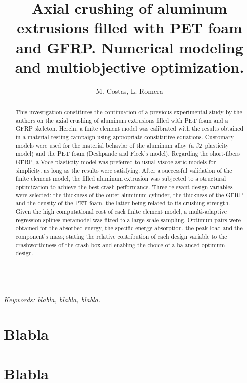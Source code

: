 \documentclass[cmfonts]{witpress}
\begin{document}
\title{Axial crushing of aluminum extrusions filled with PET foam and GFRP. Numerical modeling and multiobjective optimization.}

\author{M. Costas, L. Romera}

\address{Structural Mechanics Group, Universidade da Coru\~na, Spain}

\maketitle

\begin{abstract}
This investigation constitutes the continuation of a previous experimental study by the authors on the axial crushing of aluminum extrusions filled with PET foam and a GFRP skeleton. Herein, a finite element model was calibrated with the results obtained in a material testing campaign using appropriate constitutive equations. Customary models were used for the material behavior of the aluminum alloy (a J2--plasticity model) and the PET foam (Deshpande and Fleck's model). Regarding the short-fibers GFRP, a Voce plasticity model was preferred to usual viscoelastic models for simplicity, as long as the results were satisfying. After a successful validation of the finite element model, the filled aluminum extrusion was subjected to a structural optimization to achieve the best crash performance. Three relevant design variables were selected: the thickness of the outer aluminum cylinder, the thickness of the GFRP and the density of the PET foam, the latter being related to its crushing strength. Given the high computational cost of each finite element model, a multi-adaptive regression splines metamodel was fitted to a large-scale sampling. Optimum pairs were obtained for the absorbed energy, the specific energy absorption, the peak load and the component's mass; stating the relative contribution of each design variable to the crashworthiness of the crash box and enabling the choice of a balanced optimum design.
\end{abstract}\\
\emph{Keywords: blabla, blabla, blabla.}

\section{Blabla}
\cite{funke84}
\section{Blabla}
\cite{brebbia84}



\end{document}
